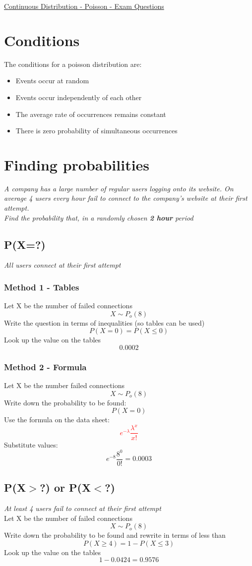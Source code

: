 \documentclass{article}[18pt]
\begin{document}
\begin{center}
\underline{\huge Continuous Distribution - Poisson - Exam Questions}
\end{center}
\section{Conditions}
The conditions for a poisson distribution are:
\begin{itemize}
\item Events occur at random
\item Events occur independently of each other
\item The average rate of occurrences remains constant
\item There is zero probability of simultaneous occurrences 
\end{itemize}
\section{Finding probabilities}
\textit{A company has a large number of regular users logging onto its website. On average 4 users
every hour fail to connect to the company's website at their first attempt.\\
Find the probability that, in a randomly chosen \textbf{2 hour} period}
\subsection{P(X=?)}
\textit{All users connect at their first attempt}
\subsubsection{Method 1 - Tables}
Let X be the number of failed connections
$$X\sim P_o(8)$$
Write the question in terms of inequalities (so tables can be used)
$$P(X=0)=P(X\leqslant0)$$
Look up the value on the tables
$$0.0002$$
\subsubsection{Method 2 - Formula}
Let X be the number failed connections
$$X\sim P_o(8)$$
Write down the probability to be found:
$$P(X=0)$$
Use the formula on the data sheet:
\textcolor{red}{$$e^{-\lambda}\frac{\lambda^x}{x!}$$}
Substitute values:
$$e^{-8}\frac{8^0}{0!}=0.0003$$
\subsection{P(X$>$?) or P(X$<$?)}
\textit{At least 4 users fail to connect at their first attempt}\\
Let X be the number of failed connections
$$X\sim P_o(8)$$
Write down the probability to be found and rewrite in terms of less than
$$P(X\geqslant4)=1-P(X\leqslant3)$$
Look up the value on the tables
$$1-0.0424=0.9576$$
\end{document}
